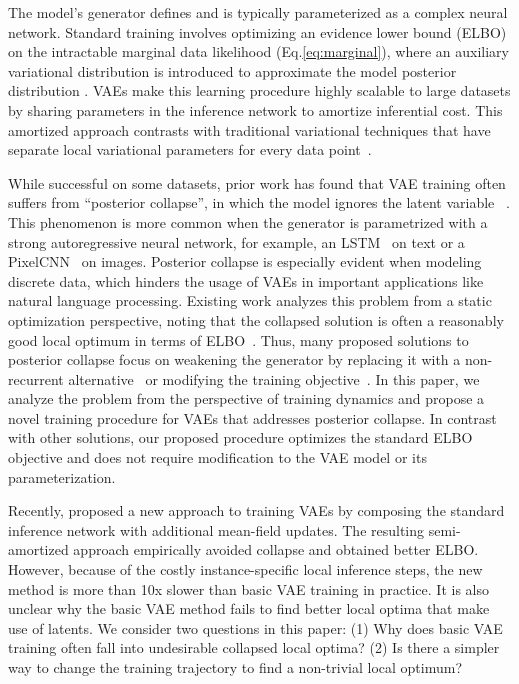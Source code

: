 \documentclass{article} \usepackage{iclr2019_conference,times}
\begin{document}
The model's generator defines  and is typically parameterized as a complex neural network. Standard training involves optimizing an evidence lower bound (ELBO) on the intractable marginal data likelihood (Eq.\ref{eq:marginal}), where an auxiliary variational distribution  is introduced to approximate the model posterior distribution . VAEs make this learning procedure highly scalable to large datasets by sharing parameters in the inference network to amortize inferential cost. This amortized approach contrasts with traditional variational techniques that have separate local variational parameters for every data point~\citep{blei2003latent,hoffman2013stochastic}.

While successful on some datasets, prior work has found that VAE training often suffers from ``posterior collapse'', in which the model ignores the latent variable ~\citep{bowman2015generating,kingma2016improved, chen2016variational}. This phenomenon is more common when the generator  is parametrized with a strong autoregressive neural network, for example, an LSTM~\citep{hochreiter1997long} on text or a PixelCNN~\citep{van2016conditional} on images.
Posterior collapse is especially evident when modeling discrete data, which hinders the usage of VAEs in important applications like natural language processing.
Existing work analyzes this problem from a static optimization perspective, noting that the collapsed solution is often a reasonably good local optimum in terms of ELBO~\citep{chen2016variational,zhao2017infovae,alemi2018fixing}.
Thus, many proposed solutions to posterior collapse focus on weakening the generator by replacing it with a non-recurrent alternative~\citep{yang2017improved,semeniuta2017hybrid} or modifying the training objective~\citep{zhao2017infovae,tolstikhin2017wasserstein}. In this paper, we analyze the problem from the perspective of training dynamics and propose a novel training procedure for VAEs that addresses posterior collapse. In contrast with other solutions, our proposed procedure optimizes the standard ELBO objective and does not require modification to the VAE model or its parameterization.

Recently, \citet{kim2018semi} proposed a new approach to training VAEs by composing the standard inference network with additional mean-field updates. The resulting semi-amortized approach empirically avoided collapse and obtained better ELBO. However, because of the costly instance-specific local inference steps, the new method is more than 10x slower than basic VAE training in practice. It is also unclear why the basic VAE method fails to find better local optima that make use of latents.
We consider two questions in this paper:
(1) Why does basic VAE training often fall into undesirable collapsed local optima?
(2) Is there a simpler way to change the training trajectory to find a non-trivial local optimum?
\end{document}
